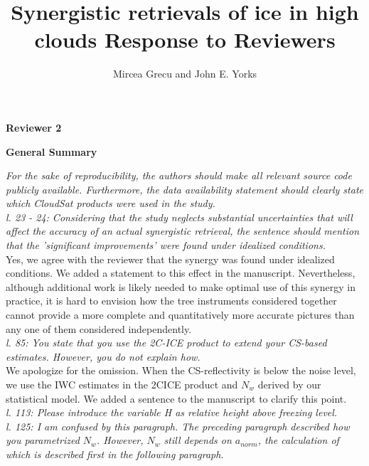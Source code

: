 \documentclass[12pt]{article}
\author{Mircea Grecu and John E. Yorks}
\title{Synergistic retrievals of ice in high clouds
Response to Reviewers}
\date{}
\begin{document}
\maketitle


\noindent \textbf{Reviewer 2}

\noindent \textbf{General Summary}

\noindent\textit{ 
For the sake of reproducibility, the authors should make all relevant source code publicly available. Furthermore, the data availability statement should clearly state which CloudSat products were used in the study.}\\

\noindent\textit{l. 23 - 24: Considering that the study neglects substantial uncertainties that will affect the accuracy of an actual synergistic retrieval, the sentence should mention that the 'significant improvements' were found under idealized conditions.}\\

\noindent Yes, we agree with the reviewer that the synergy was found under idealized conditions. We added a statement to this effect in the manuscript. Nevertheless, although additional work is likely needed to make optimal use of this synergy in practice, it is hard to envision how the tree instruments considered together cannot provide a more complete and quantitatively more accurate pictures than any one of them considered independently.\\

\noindent\textit{l. 85: You state that you use the 2C-ICE product to extend your CS-based estimates. However, you do not explain how.} \\

\noindent We apologize for the omission. When the CS-reflectivity is below the noise level, we use the IWC estimates in the 2C\-ICE product and $N_w$ derived by our statistical model. We added a sentence to the manuscript to clarify this point.\\

\noindent\textit{l. 113: Please introduce the variable H as relative height above freezing level.}\\

\noindent\textit{l. 125: I am confused by this paragraph. The preceding paragraph described how you parametrized $N_w$. However, $N_w$ still depends on $a_{norm}$, the calculation of which is described first in the following paragraph.}\\
\end{document}
